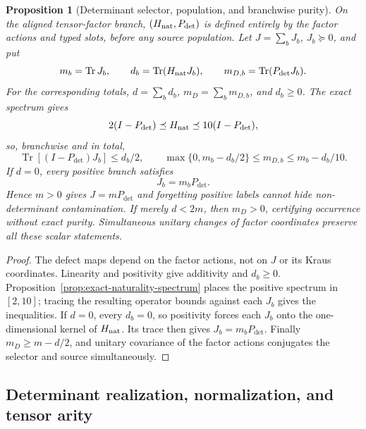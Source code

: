 \documentclass[11pt]{article}
\numberwithin{equation}{section}
\newtheorem{proposition}[theorem]{Proposition}
\theoremstyle{definition}
\theoremstyle{remark}
\newcommand{\Tr}{\operatorname{Tr}}
\begin{document}
\begin{proposition}[Determinant selector, population, and branchwise purity]
\label{thm:determinant-skeleton-population}
On the aligned tensor-factor branch, $(H_{\rm nat},P_{\det})$ is defined
entirely by the factor actions and typed slots, before any source population.
Let $J=\sum_bJ_b$, $J_b\succeq0$, and put
\begin{equation}
 m_b=\Tr J_b,\qquad d_b=\Tr(H_{\rm nat}J_b),\qquad
 m_{D,b}=\Tr(P_{\det}J_b).
 \label{eq:determinant-branch-masses}
\end{equation}
For the corresponding totals, $d=\sum_bd_b$, $m_D=\sum_bm_{D,b}$, and
$d_b\ge0$.  The exact spectrum gives
\begin{equation}
 2(I-P_{\det})\preceq H_{\rm nat}\preceq10(I-P_{\det}),
 \label{eq:naturality-two-sided-gap}
\end{equation}
so, branchwise and in total,
\begin{equation}
 \Tr[(I-P_{\det})J_b]\le d_b/2,\qquad
 \max\{0,m_b-d_b/2\}\le m_{D,b}\le m_b-d_b/10.
 \label{eq:determinant-branch-bounds}
\end{equation}
If $d=0$, every positive branch satisfies
\begin{equation}
 J_b=m_bP_{\det}.\label{eq:determinant-branch-purity}
\end{equation}
Hence $m>0$ gives $J=mP_{\det}$ and forgetting positive labels cannot hide
non-determinant contamination.  If merely $d<2m$, then $m_D>0$, certifying
occurrence without exact purity.  Simultaneous unitary changes of factor
coordinates preserve all these scalar statements.
\end{proposition}
\begin{proof}
The defect maps depend on the factor actions, not on $J$ or its Kraus
coordinates.  Linearity and positivity give additivity and $d_b\ge0$.
Proposition~\ref{prop:exact-naturality-spectrum} places the positive spectrum
in $[2,10]$; tracing the resulting operator bounds against each $J_b$
gives the inequalities.  If $d=0$, every $d_b=0$, so positivity forces each
$J_b$ onto the one-dimensional kernel of $H_{\rm nat}$.  Its trace then
gives $J_b=m_bP_{\det}$.  Finally $m_D\ge m-d/2$, and unitary covariance
of the factor actions conjugates the selector and source simultaneously.
\end{proof}


\subsection{Determinant realization, normalization, and tensor arity}
\label{app:anomaly}
\end{document}
